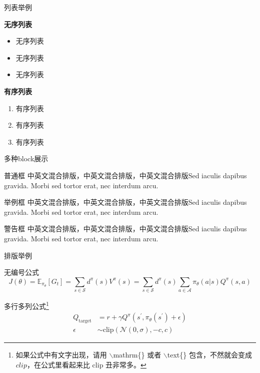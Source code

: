 \documentclass{beamer}
\begin{document}
\begin{frame}{列表举例}
	\begin{block}{\textbf{无序列表}}
		\begin{itemize}
			\item 无序列表
			\item 无序列表
			\item 无序列表
		\end{itemize}
	\end{block}
	
	\begin{block}{\textbf{有序列表}}
		\begin{enumerate}
			\item 有序列表
			\item 有序列表
			\item 有序列表
		\end{enumerate}
	\end{block}
\end{frame}

\begin{frame}{多种block展示}
	\begin{block}{普通框}
		中英文混合排版，中英文混合排版，中英文混合排版Sed iaculis
		dapibus gravida. Morbi sed tortor erat, nec interdum arcu. 
	\end{block}
	\begin{exampleblock}{举例框}
		中英文混合排版，中英文混合排版，中英文混合排版Sed iaculis
		dapibus gravida. Morbi sed tortor erat, nec interdum arcu.
	\end{exampleblock}
	\begin{alertblock}{警告框}
		中英文混合排版，中英文混合排版，中英文混合排版Sed iaculis
		dapibus gravida. Morbi sed tortor erat, nec interdum arcu.
	\end{alertblock}
\end{frame}


\begin{frame}{排版举例}
    \begin{exampleblock}{无编号公式} %
        \begin{equation*}
            J(\theta) = \mathbb{E}_{\pi_\theta}[G_t] = \sum_{s\in\mathcal{S}} d^\pi (s)V^\pi(s)=\sum_{s\in\mathcal{S}} d^\pi(s)\sum_{a\in\mathcal{A}}\pi_\theta(a|s)Q^\pi(s,a)
        \end{equation*}
    \end{exampleblock}
    \begin{exampleblock}{多行多列公式\footnote{如果公式中有文字出现，请用 $\backslash$mathrm\{\} 或者 $\backslash$text\{\} 包含，不然就会变成 $clip$，在公式里看起来比 $\mathrm{clip}$ 丑非常多。}}
        \begin{align}
            Q_\mathrm{target}&=r+\gamma Q^\pi(s^\prime, \pi_\theta(s^\prime)+\epsilon)\\
            \epsilon&\sim\mathrm{clip}(\mathcal{N}(0, \sigma), -c, c)\nonumber
        \end{align}
    \end{exampleblock}
\end{frame}
\end{document}
